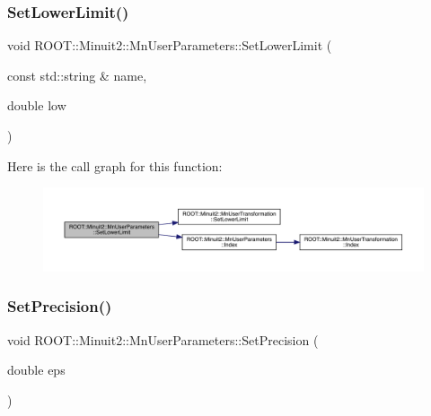 \mbox{\label{classROOT_1_1Minuit2_1_1MnUserParameters_a3423d925b9a4b455c6130fa19f66adb4}} 
\subsubsection{\texorpdfstring{SetLowerLimit()}{SetLowerLimit()}\hspace{0.1cm}{\footnotesize\ttfamily [6/6]}}
{\footnotesize\ttfamily void R\+O\+O\+T\+::\+Minuit2\+::\+Mn\+User\+Parameters\+::\+Set\+Lower\+Limit (\begin{DoxyParamCaption}\item[{const std\+::string \&}]{name,  }\item[{double}]{low }\end{DoxyParamCaption})}

Here is the call graph for this function\+:
\nopagebreak
\begin{figure}[H]
\begin{center}
\leavevmode
\includegraphics[width=350pt]{d6/d10/classROOT_1_1Minuit2_1_1MnUserParameters_a3423d925b9a4b455c6130fa19f66adb4_cgraph}
\end{center}
\end{figure}
\mbox{\label{classROOT_1_1Minuit2_1_1MnUserParameters_aceaa10ac8b2c83261c3cc026705ee6e0}} 
\subsubsection{\texorpdfstring{SetPrecision()}{SetPrecision()}\hspace{0.1cm}{\footnotesize\ttfamily [1/3]}}
{\footnotesize\ttfamily void R\+O\+O\+T\+::\+Minuit2\+::\+Mn\+User\+Parameters\+::\+Set\+Precision (\begin{DoxyParamCaption}\item[{double}]{eps }\end{DoxyParamCaption})\hspace{0.3cm}{\ttfamily [inline]}}

